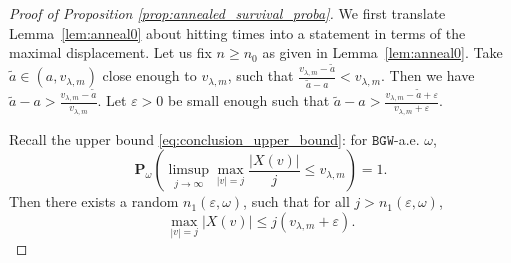\documentclass[11 pt]{article}
\theoremstyle{definition}
\numberwithin{equation}{section}
\newcommand{\Pw}{\mathbf{P}_{\omega}} %
\begin{document}
\begin{proof}[Proof of Proposition \ref{prop:annealed_survival_proba}] 
	We first translate Lemma~\ref{lem:anneal0} about hitting times into a statement in terms of the maximal displacement. Let us fix $n\ge n_0$ as given in Lemma~\ref{lem:anneal0}. 
	Take $\tilde{a}\in (a,v_{\lambda,m})$ close enough to $v_{\lambda,m}$, such that $\frac{v_{\lambda,m}-\tilde{a}}{\tilde{a}-a}<v_{\lambda,m}$. 
	 Then we have $\tilde{a}-a > \frac{v_{\lambda,m}-\tilde{a}}{v_{\lambda,m}}$. Let $\varepsilon>0$ be small enough such that  $\tilde{a} -a > \frac{v_{\lambda, m}-\tilde{a}+\varepsilon}{v_{\lambda, m}+ \varepsilon}$. 
	
	Recall the upper bound \eqref{eq:conclusion_upper_bound}: for $\mathtt{BGW}$-a.e. $\omega$, 
		\[
	\Pw \left(\limsup_{j \to \infty} \max_{|v| = j } \frac{|X(v)|}{j} \le v_{\lambda, m}  \right)= 1. 
	\]
	Then there exists a random $n_1(\varepsilon,\omega)$, such that for all $j>n_1(\varepsilon,\omega)$, 
	\begin{equation}\label{eq:upperbdd}
		\max_{|v| = j } |X(v)| \le j (v_{\lambda, m}+ \varepsilon).
	\end{equation}
	

\end{proof}
\end{document}
